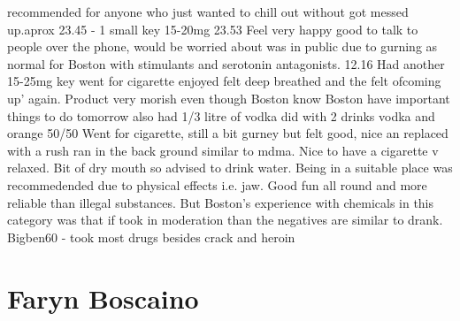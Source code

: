 \documentclass[12pt]{book}
\begin{document}
recommended for anyone who just wanted to chill out without got messed up.aprox 23.45 - 1 small key 15-20mg 23.53 Feel very happy good to talk to people over the phone, would be worried about was in public due to gurning as normal for Boston with stimulants and serotonin antagonists. 12.16 Had another 15-25mg key went for cigarette enjoyed felt deep breathed and the felt ofcoming up' again. Product very morish even though Boston know Boston have important things to do tomorrow also had 1/3 litre of vodka did with 2 drinks vodka and orange 50/50 Went for cigarette, still a bit gurney but felt good, nice an replaced with a rush ran in the back ground similar to mdma. Nice to have a cigarette v relaxed. Bit of dry mouth so advised to drink water. Being in a suitable place was recommedended due to physical effects i.e. jaw. Good fun all round and more reliable than illegal substances. But Boston's experience with chemicals in this category was that if took in moderation than the negatives are similar to drank. Bigben60 - took most drugs besides crack and heroin



\chapter{Faryn Boscaino}
\end{document}
